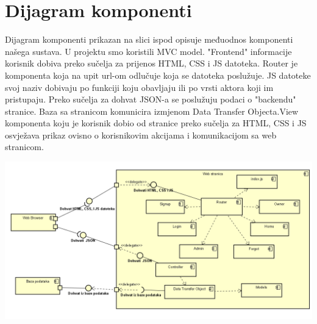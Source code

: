 			 
			\eject
		\section{Dijagram komponenti}
		
			\begin{flushleft}
			 \text Dijagram komponenti prikazan na slici ispod opisuje međuodnos komponenti našega sustava. U projektu smo koristili MVC model. "Frontend" informacije korisnik dobiva preko sučelja za prijenos HTML, CSS i JS datoteka. Router je komponenta koja na upit url-om odlučuje koja se datoteka poslužuje. JS datoteke svoj naziv dobivaju po funkciji koju obavljaju ili po vrsti aktora koji im pristupaju. Preko sučelja za dohvat JSON-a se poslužuju podaci o "backendu" stranice. Baza sa stranicom komunicira izmjenom Data Transfer Objecta.View komponenta koju je korisnik dobio od stranice preko sučelja za HTML, CSS i JS osvježava prikaz ovisno o korisnikovim akcijama i komunikacijom sa web stranicom.
			 \end{flushleft}
		    \centering
			 \includegraphics[width=16cm]{slike/dijagram komponenti.png}